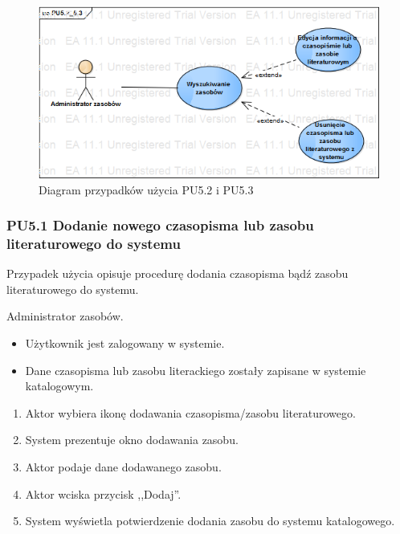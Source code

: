 \begin{figure}[h!]
	\centering
	\includegraphics[scale=0.6]{img/diagrams/useCaseDiagrams/PU5_2_5_3.png}
	\caption{Diagram przypadków użycia PU5.2 i PU5.3 \label{fig:labelUCPU5.2_5.3}}
\end{figure}

\subsubsection{PU5.1 Dodanie nowego czasopisma lub zasobu literaturowego do systemu}

Przypadek użycia opisuje procedurę dodania czasopisma bądź zasobu literaturowego do systemu.

Administrator zasobów.

\begin{itemize}
\item Użytkownik jest zalogowany w systemie.
\end{itemize}

\begin{itemize}
\item Dane czasopisma lub zasobu literackiego zostały zapisane w systemie katalogowym.
\end{itemize}

\begin{enumerate}
\item \label{pu5.1:1} Aktor wybiera ikonę dodawania czasopisma/zasobu literaturowego.
\item System prezentuje okno dodawania zasobu.
\item Aktor podaje dane dodawanego zasobu.
\item \label{pu5.1:4} Aktor wciska przycisk ,,Dodaj''.
\item System wyświetla potwierdzenie dodania zasobu do systemu katalogowego.
\end{enumerate}

